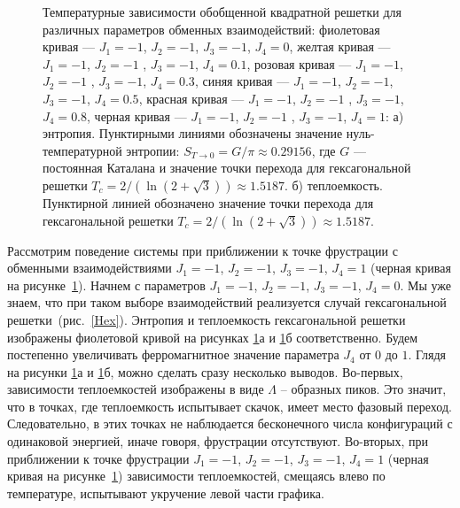 \begin{figure}[h]
	\begin{minipage}[h]{0.5\linewidth}
	\end{minipage}
	\hfill
	\begin{minipage}[h]{0.5\linewidth}
	\end{minipage}
	\caption{Температурные зависимости обобщенной квадратной решетки для различных параметров обменных взаимодействий: фиолетовая кривая --- $J_1 = -1$, $J_2 = -1$, $J_3 = -1$, $J_4 = 0$, желтая кривая --- $J_1 = -1$, $J_2 = -1$ , $J_3 = -1$, $J_4 = 0.1$, розовая кривая --- $J_1 = -1$, $J_2 = -1$ , $J_3 = -1$, $J_4 = 0.3$, синяя кривая --- $J_1 = -1$, $J_2 = -1$, $J_3 = -1$, $J_4 = 0.5$, красная кривая --- $J_1 = -1$, $J_2 = -1$ , $J_3 = -1$, $J_4 = 0.8$, черная кривая --- $J_1 = -1$, $J_2 = -1$ , $J_3 = -1$, $J_4 = 1$: а) энтропия. Пунктирными линиями обозначены значение нуль-температурной энтропии: $S_{T\rightarrow 0} = G/\pi\approx 0.29156$, где $G$ --- постоянная Каталана и значение точки перехода для гексагональной решетки $T_c = 2/(\ln(2+\sqrt{3}))\approx 1.5187$. б) теплоемкость. Пунктирной линией обозначено значение точки перехода для гексагональной решетки $T_c = 2/(\ln(2+\sqrt{3}))\approx 1.5187$. }
	\label{Peak2}
\end{figure}

Рассмотрим поведение системы при приближении к точке фрустрации с обменными взаимодействиями $J_1 = -1$, $J_2 = -1$, $J_3 = -1$, $J_4 = 1$ (черная кривая на рисунке~\ref{Peak2}). Начнем с параметров $J_1 = -1$, $J_2 = -1$, $J_3 = -1$, $J_4 = 0$. Мы уже знаем, что при таком выборе взаимодействий реализуется случай гексагональной решетки~(рис.~\ref{Hex}). Энтропия и теплоемкость гексагональной решетки изображены фиолетовой кривой на рисунках \ref{Peak2}а и \ref{Peak2}б соответственно. Будем постепенно увеличивать ферромагнитное значение параметра $J_4$ от $0$ до $1$. Глядя на рисунки \ref{Peak2}а и \ref{Peak2}б, можно сделать сразу несколько выводов. Во-первых, зависимости теплоемкостей изображены в виде $\Lambda$ -- образных пиков. Это значит, что в точках, где теплоемкость испытывает скачок, имеет место фазовый переход. Следовательно, в этих точках не наблюдается бесконечного числа конфигураций с одинаковой энергией, иначе говоря, фрустрации отсутствуют. Во-вторых, при приближении к точке фрустрации $J_1 = -1$, $J_2 = -1$, $J_3 = -1$, $J_4 = 1$ (черная кривая на рисунке~\ref{Peak2}) зависимости теплоемкостей, смещаясь влево по температуре, испытывают укручение левой части графика.

